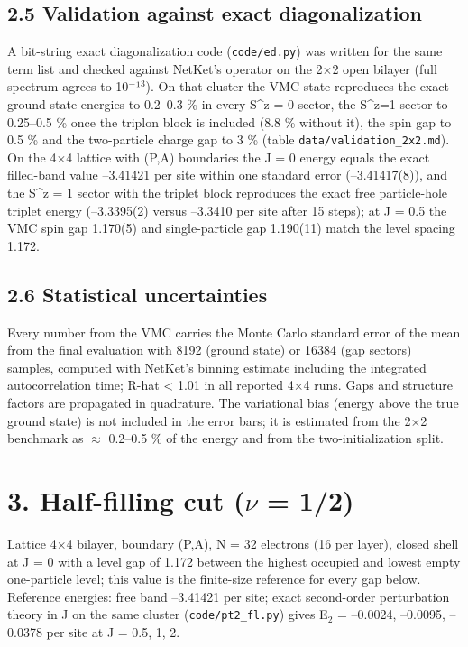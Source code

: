 \documentclass[10pt]{article}
\begin{document}
\subsection*{2.5 Validation against exact diagonalization}

A bit-string exact diagonalization code (\texttt{code/ed.py}) was written for the same term list and checked against NetKet's operator on the 2$\times$2 open bilayer (full spectrum agrees to 10$^-$¹$^3$). On that cluster the VMC state reproduces the exact ground-state energies to 0.2--0.3 \% in every S\^{}z = 0 sector, the S\^{}z=1 sector to 0.25--0.5 \% once the triplon block is included (8.8 \% without it), the spin gap to 0.5 \% and the two-particle charge gap to 3 \% (table \texttt{data/validation\_2x2.md}). On the 4$\times$4 lattice with (P,A) boundaries the J = 0 energy equals the exact filled-band value --3.41421 per site within one standard error (--3.41417(8)), and the S\^{}z = 1 sector with the triplet block reproduces the exact free particle-hole triplet energy (--3.3395(2) versus --3.3410 per site after 15 steps); at J = 0.5 the VMC spin gap 1.170(5) and single-particle gap 1.190(11) match the level spacing 1.172.

\subsection*{2.6 Statistical uncertainties}

Every number from the VMC carries the Monte Carlo standard error of the mean from the final evaluation with 8192 (ground state) or 16384 (gap sectors) samples, computed with NetKet's binning estimate including the integrated autocorrelation time; R-hat < 1.01 in all reported 4$\times$4 runs. Gaps and structure factors are propagated in quadrature. The variational bias (energy above the true ground state) is not included in the error bars; it is estimated from the 2$\times$2 benchmark as $\approx$ 0.2--0.5 \% of the energy and from the two-initialization split.

\section*{3. Half-filling cut ($\nu$ = 1/2)}

Lattice 4$\times$4 bilayer, boundary (P,A), N = 32 electrons (16 per layer), closed shell at J = 0 with a level gap of 1.172 between the highest occupied and lowest empty one-particle level; this value is the finite-size reference for every gap below. Reference energies: free band --3.41421 per site; exact second-order perturbation theory in J on the same cluster (\texttt{code/pt2\_fl.py}) gives E$_2$ = --0.0024, --0.0095, --0.0378 per site at J = 0.5, 1, 2.
\end{document}
